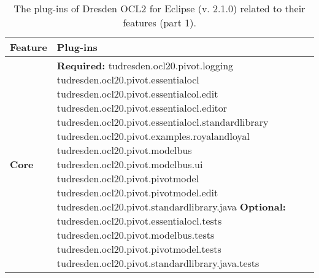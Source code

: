 \begin{table}[h]
\begin{tabular}{|p{4cm}|p{10cm}|}
    \hline
    \textbf{Feature} & \textbf{Plug-ins} \\
    \hline

    \textbf{Core} & 
    \textbf{Required:}\newline
    tudresden.ocl20.pivot.logging\newline
    tudresden.ocl20.pivot.essentialocl\newline
    tudresden.ocl20.pivot.essentialcol.edit\newline
    tudresden.ocl20.pivot.essentialocl.editor\newline
    tudresden.ocl20.pivot.essentialocl.standardlibrary\newline
    tudresden.ocl20.pivot.examples.royalandloyal\newline
    tudresden.ocl20.pivot.modelbus\newline
    tudresden.ocl20.pivot.modelbus.ui\newline
    tudresden.ocl20.pivot.pivotmodel\newline
    tudresden.ocl20.pivot.pivotmodel.edit\newline
    tudresden.ocl20.pivot.standardlibrary.java\newline\newline
    \textbf{Optional:}\newline
    tudresden.ocl20.pivot.essentialocl.tests\newline
    tudresden.ocl20.pivot.modelbus.tests\newline
    tudresden.ocl20.pivot.pivotmodel.tests\newline
    tudresden.ocl20.pivot.standardlibrary.java.tests\\
    \hline

\end{tabular}
\caption{The plug-ins of Dresden OCL2 for Eclipse (v. 2.1.0) related to their features (part 1).}
\label{tab:plugins}
\end{table}

